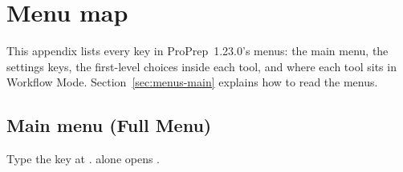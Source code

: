 \chapter{Menu map}\label{app:menumap}

This appendix lists every key in ProPrep~1.23.0's menus: the main menu, the
settings keys, the first-level choices inside each tool, and where each tool
sits in Workflow Mode. Section~\ref{sec:menus-main} explains how to read the
menus.

\section{Main menu (Full Menu)}\label{sec:menumap-main}

Type the key at .  alone opens
.

